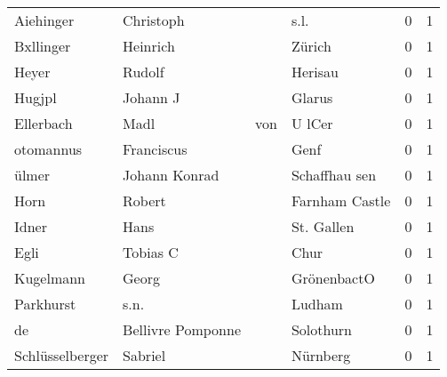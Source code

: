 \begin{center}
\begin{tiny}
\begin{longtabu}{llllrr}
                Aiehinger &                          Christoph &             &                                        s.l. &          0 &         1 \\
                Bxllinger &                           Heinrich &             &                                      Zürich &          0 &         1 \\
                    Heyer &                             Rudolf &             &                                     Herisau &          0 &         1 \\
                   Hugjpl &                           Johann J &             &                                      Glarus &          0 &         1 \\
                Ellerbach &                               Madl &         von &                                      U lCer &          0 &         1 \\
                otomannus &                         Franciscus &             &                                        Genf &          0 &         1 \\
                    ülmer &                      Johann Konrad &             &                               Schaffhau sen &          0 &         1 \\
                     Horn &                             Robert &             &                              Farnham Castle &          0 &         1 \\
                    Idner &                               Hans &             &                                  St. Gallen &          0 &         1 \\
                     Egli &                           Tobias C &             &                                        Chur &          0 &         1 \\
                Kugelmann &                              Georg &             &                                 GrönenbactO &          0 &         1 \\
                Parkhurst &                               s.n. &             &                                      Ludham &          0 &         1 \\
                       de &                  Bellivre Pomponne &             &                                   Solothurn &          0 &         1 \\
          Schlüsselberger &                            Sabriel &             &                                    Nürnberg &          0 &         1 \\

\end{longtabu}
\end{tiny}
\end{center}
